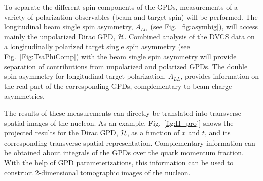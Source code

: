 To separate the different spin components of the GPDs, measurements of a 
variety of polarization observables (beam and target spin) will be performed. 
The longitudinal beam single spin asymmetry, $A_{LU}$ (see 
Fig.~\ref{fig:asymbig}), will access mainly the unpolarized Dirac GPD, 
$\cal H$.  Combined analysis of the DVCS data on a longitudinally polarized 
target single spin asymmetry (see Fig.~\ref{Fig:TsaPhiComp}) with the beam 
single spin asymmetry will provide separation of contributions from 
unpolarized and polarized GPDs.  The double spin asymmetry for longitudinal 
target polarization, $A_{LL}$, provides information on the real part of the 
corresponding GPDs, complementary to beam charge asymmetries.
 
The results of these measurements can directly be translated into transverse 
spatial images of the nucleon. As an example, Fig.~\ref{fig:H_proj} shows 
the projected results for the Dirac GPD, $\cal H$, as a function of $x$ and 
$t$, and its corresponding transverse spatial representation.  Complementary 
information can be obtained about integrals of the GPDs over the quark 
momentum fraction. With the help of GPD parameterizations, this information 
can be used to construct 2-dimensional tomographic images of the nucleon.

